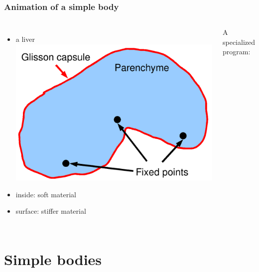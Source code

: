 \documentclass[a4paper,compress]{beamer}
\begin{document}
\begin{frame}[fragile]
\frametitle{Animation of a simple body}
\begin{columns}

\begin{itemize}
\item a liver
\includegraphics[width=\linewidth]{liver_2ForceFields.png}
\item inside: soft material
\item surface: stiffer material
\end{itemize}

A specialized program:
\lstset{basicstyle=\large}

\end{columns}

\end{frame}





\section{Simple bodies}
\end{document}
